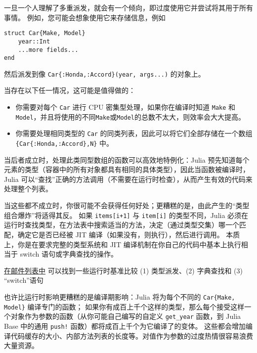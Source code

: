 一旦一个人理解了多重派发，就会有一个倾向，即过度使用它并尝试将其用于所有事情。 例如，您可能会想象使用它来存储信息，例如




\begin{lstlisting}
struct Car{Make, Model}
    year::Int
    ...more fields...
end
\end{lstlisting}



然后派发到像 \texttt{Car\{:Honda,:Accord\}(year, args...)} 的对象上。



当存在以下任一情况，这可能是值得做的：



\begin{itemize}
\item 你需要对每个 \texttt{Car} 进行 CPU 密集型处理，如果你在编译时知道 \texttt{Make} 和 \texttt{Model}，并且将使用的不同\texttt{Make}或\texttt{Model}的总数不太大，则效率会大大提高。


\item 你需要处理相同类型的 \texttt{Car} 的同类列表，因此可以将它们全部存储在一个数组\texttt{\{Car\{:Honda,:Accord\},N\}} 中。

\end{itemize}


当后者成立时，处理此类同型数组的函数可以高效地特例化：Julia 预先知道每个元素的类型（容器中的所有对象都具有相同的具体类型），因此当函数被编译时， Julia 可以“查找”正确的方法调用（不需要在运行时检查），从而产生有效的代码来处理整个列表。



当这些都不成立时，你很可能不会获得任何好处；更糟糕的是，由此产生的“类型组合爆炸”将适得其反。 如果 \texttt{items[i+1]} 与 \texttt{item[i]} 的类型不同，Julia 必须在运行时查找类型，在方法表中搜索适当的方法，决定（通过类型交集）哪一个匹配，确定它是否已经被 JIT 编译（如果没有，则执行），然后进行调用。 本质上，你是在要求完整的类型系统和 JIT 编译机制在你自己的代码中基本上执行相当于 switch 语句或字典查找的操作。



\href{https://groups.google.com/forum/\#!msg/julia-users/jUMu9A3QKQQ/qjgVWr7vAwAJ}{在邮件列表中} 可以找到一些运行时基准比较 (1) 类型派发、(2) 字典查找和 (3) “switch”语句



也许比运行时影响更糟糕的是编译期影响：Julia 将为每个不同的 \texttt{Car\{Make, Model\}} 编译专门的函数； 如果你有成百上千个这样的类型，那么每个接受这样一个对象作为参数的函数（从你可能自己编写的自定义 \texttt{get\_year} 函数，到 Julia Base 中的通用 \texttt{push!} 函数）都将成百上千个为它编译了的变体。 这些都会增加编译代码缓存的大小、内部方法列表的长度等。对值作为参数的过度热情很容易浪费大量资源。




